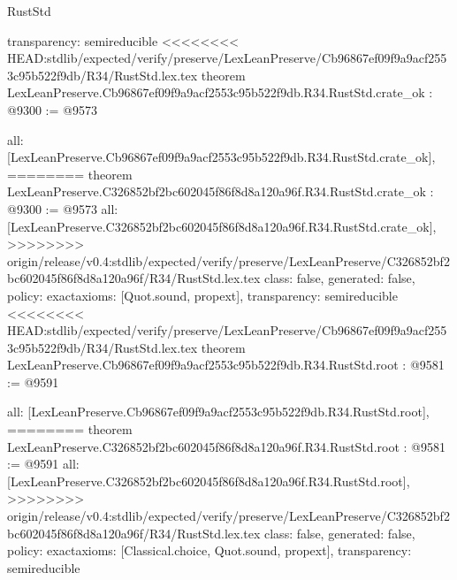 \begin{lexlean}{RustStd}
\begin{coremodule}
{\begin{coremodule}
{{{{{{{{{{{{{{  transparency: semireducible
}
<<<<<<<< HEAD:stdlib/expected/verify/preserve/LexLeanPreserve/Cb96867ef09f9a9acf2553c95b522f9db/R34/RustStd.lex.tex
theorem LexLeanPreserve.Cb96867ef09f9a9acf2553c95b522f9db.R34.RustStd.crate_ok : @9300 := @9573 {
  all: [LexLeanPreserve.Cb96867ef09f9a9acf2553c95b522f9db.R34.RustStd.crate_ok],
========
theorem LexLeanPreserve.C326852bf2bc602045f86f8d8a120a96f.R34.RustStd.crate_ok : @9300 := @9573 {
  all: [LexLeanPreserve.C326852bf2bc602045f86f8d8a120a96f.R34.RustStd.crate_ok],
>>>>>>>> origin/release/v0.4:stdlib/expected/verify/preserve/LexLeanPreserve/C326852bf2bc602045f86f8d8a120a96f/R34/RustStd.lex.tex
  class: false,
  generated: false,
  policy: exact{axioms: [Quot.sound, propext]},
  transparency: semireducible
}
<<<<<<<< HEAD:stdlib/expected/verify/preserve/LexLeanPreserve/Cb96867ef09f9a9acf2553c95b522f9db/R34/RustStd.lex.tex
theorem LexLeanPreserve.Cb96867ef09f9a9acf2553c95b522f9db.R34.RustStd.root : @9581 := @9591 {
  all: [LexLeanPreserve.Cb96867ef09f9a9acf2553c95b522f9db.R34.RustStd.root],
========
theorem LexLeanPreserve.C326852bf2bc602045f86f8d8a120a96f.R34.RustStd.root : @9581 := @9591 {
  all: [LexLeanPreserve.C326852bf2bc602045f86f8d8a120a96f.R34.RustStd.root],
>>>>>>>> origin/release/v0.4:stdlib/expected/verify/preserve/LexLeanPreserve/C326852bf2bc602045f86f8d8a120a96f/R34/RustStd.lex.tex
  class: false,
  generated: false,
  policy: exact{axioms: [Classical.choice, Quot.sound, propext]},
  transparency: semireducible
}

}}}}}}}}}}}}}}}
\end{coremodule}}
\end{coremodule}
\end{lexlean}
